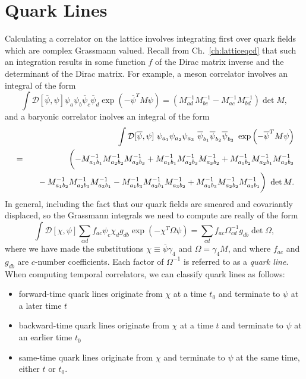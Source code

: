 \section{Quark Lines}
Calculating a correlator on the lattice involves integrating first over quark fields which are complex Grassmann valued. Recall from Ch.~\ref{ch:latticeqcd} that such an integration results in some function $f$ of the Dirac matrix inverse and the determinant of the Dirac matrix. For example, a meson correlator involves an integral of the form
\begin{equation}
    \int \mathcal{D}[\overline{\psi}, \psi] \psi_{a} \psi_{b} \overline{\psi}_{c} \overline{\psi}_{d} \exp \left(-\overline{\psi}^{T} M \psi\right) = \left(M_{a d}^{-1} M_{b c}^{-1}-M_{a c}^{-1} M_{b d}^{-1}\right) \det M,
\end{equation}
and a baryonic correlator inolves an integral of the form
\begin{eqnarray}
    &&\int {\cal D}[\overline{\psi},\psi]\ \psi_{a_1}\psi_{a_2}\psi_{a_3}
       \ \overline{\psi}_{b_1}\overline{\psi}_{b_2}\overline{\psi}_{b_3}
     \ \exp\left( -\overline{\psi}^T M \psi \right)\nonumber\\
     &=&\biggl( - M_{a_1b_1}^{-1}M^{-1}_{a_2b_2}M^{-1}_{a_3b_3}
     +M^{-1}_{a_1b_1}M^{-1}_{a_2b_3}M^{-1}_{a_3b_2}
      +M^{-1}_{a_1b_2}M^{-1}_{a_2b_1}M^{-1}_{a_3b_3} \nonumber\\
    && \phantom{\biggl(}-M_{a_1b_2}^{-1}M^{-1}_{a_2b_3}M^{-1}_{a_3b_1}
     -M^{-1}_{a_1b_3}M^{-1}_{a_2b_1}M^{-1}_{a_3b_2}
      +M^{-1}_{a_1b_3}M^{-1}_{a_2b_2}M^{-1}_{a_3b_1}   
      \biggr)\ \det M.
      \label{eq:barywick}
\end{eqnarray}
In general, including the fact that our quark fields are smeared and covariantly displaced, so the Grassmann integrals we need to compute are really of the form
\begin{equation}
    \int \mathcal{D}[\chi, \psi] \sum_{\alpha d} f_{a c} \psi_{c} \chi_{d} g_{d b} \exp \left(-\chi^{T} \Omega \psi\right)=\sum_{c d} f_{a c} \Omega_{c d}^{-1} g_{d b} \operatorname{det} \Omega,
\end{equation}
where we have made the substitutions $\chi \equiv \overline \psi \gamma_4$ and $\Omega = \gamma_4 M$, and where $f_{ac}$ and $g_{db}$ are $c$-number coefficients. Each factor of $\Omega^{-1}$ is referred to as a \emph{quark line}. When computing temporal correlators, we can classify quark lines as follows:
\begin{itemize}
    \item forward-time quark lines originate from $\chi$ at a time $t_0$ and terminate to $\psi$ at a later time $t$
    \item backward-time quark lines originate from $\chi$ at a time $t$ and terminate to $\psi$ at an earlier time $t_0$
    \item same-time quark lines originate from $\chi$ and terminate to $\psi$ at the same time, either $t$ or $t_0$.
\end{itemize}
